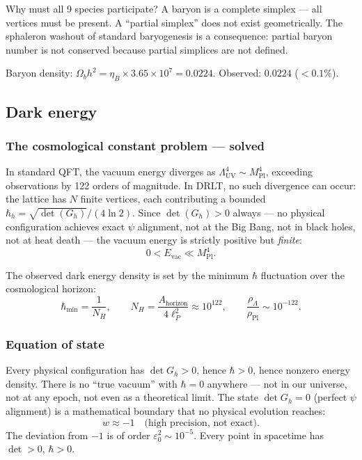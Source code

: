 Why must all 9 species participate? A baryon is a complete simplex --- all vertices must be present. A ``partial simplex'' does not exist geometrically. The sphaleron washout of standard baryogenesis is a consequence: partial baryon number is not conserved because partial simplices are not defined.

Baryon density: $\Omega_b h^2 = \eta_B \times 3.65 \times 10^7 = 0.0224$. Observed: $0.0224$ ($< 0.1\%$).

\subsection{Dark energy}

\subsubsection{The cosmological constant problem --- solved}

In standard QFT, the vacuum energy diverges as $\Lambda^4_\text{UV} \sim M_\text{Pl}^4$, exceeding observations by 122 orders of magnitude. In DRLT, no such divergence can occur: the lattice has $N$ finite vertices, each contributing a bounded $\hbar_h = \sqrt{\det(G_h)}/(4\ln 2)$. Since $\det(G_h) > 0$ always --- no physical configuration achieves exact $\psi$ alignment, not at the Big Bang, not in black holes, not at heat death --- the vacuum energy is strictly positive but \emph{finite}:
\begin{equation}
0 < E_\text{vac} \ll M_\text{Pl}^4.
\end{equation}

The observed dark energy density is set by the minimum $\hbar$ fluctuation over the cosmological horizon:
\begin{equation}
\hbar_\text{min} = \frac{1}{N_H}, \qquad N_H = \frac{A_\text{horizon}}{4\ell_P^2} \approx 10^{122}, \qquad \frac{\rho_\Lambda}{\rho_\text{Pl}} \sim 10^{-122}.
\end{equation}

\subsubsection{Equation of state}

Every physical configuration has $\det G_h > 0$, hence $\hbar > 0$, hence nonzero energy density. There is no ``true vacuum'' with $\hbar = 0$ anywhere --- not in our universe, not at any epoch, not even as a theoretical limit. The state $\det G_h = 0$ (perfect $\psi$ alignment) is a mathematical boundary that no physical evolution reaches:
\begin{equation}
\boxed{w \approx -1 \quad\text{(high precision, not exact)}.}
\end{equation}
The deviation from $-1$ is of order $\varepsilon_0^2 \sim 10^{-5}$. Every point in spacetime has $\det > 0$, $\hbar > 0$.

